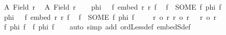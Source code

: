 \begin{isabellebody}
\ {\isacharquery}{\kern0pt}A{}\ {\isacharequal}{\kern0pt}{\isachardoublequoteopen}Field\ r{}{\isachardoublequoteclose}\ \isamarkupfalse%
\ {\isacharquery}{\kern0pt}A{}\ {\isacharequal}{\kern0pt}{\isachardoublequoteopen}Field\ r{}{\isachardoublequoteclose}\isanewline
\ \ \isamarkupfalse%
\ {\isacharquery}{\kern0pt}phi{}{}\ {\isacharequal}{\kern0pt}\ {\isachardoublequoteopen}{\isasymlambda}\ f{}{}{\isachardot}{\kern0pt}\ embed\ r{}\ r{}\ f{}{}{\isachardoublequoteclose}\ \isamarkupfalse%
\ {\isacharquery}{\kern0pt}f{}{}\ {\isacharequal}{\kern0pt}\ {\isachardoublequoteopen}SOME\ f{\isachardot}{\kern0pt}\ {\isacharquery}{\kern0pt}phi{}{}\ f{\isachardoublequoteclose}\isanewline
\ \ \isamarkupfalse%
\ {\isacharquery}{\kern0pt}phi{}{}\ {\isacharequal}{\kern0pt}\ {\isachardoublequoteopen}{\isasymlambda}\ f{}{}{\isachardot}{\kern0pt}\ embed\ r{}\ r{}\ f{}{}{\isachardoublequoteclose}\ \isamarkupfalse%
\ {\isacharquery}{\kern0pt}f{}{}\ {\isacharequal}{\kern0pt}\ {\isachardoublequoteopen}SOME\ f{\isachardot}{\kern0pt}\ {\isacharquery}{\kern0pt}phi{}{}\ f{\isachardoublequoteclose}\isanewline
\ \ \isamarkupfalse%
\ {\isacharasterisk}{\kern0pt}{\isacharcolon}{\kern0pt}\ {\isachardoublequoteopen}r{}\ {\isacharless}{\kern0pt}o\ r{}{\isachardoublequoteclose}\ {\isachardoublequoteopen}r{}\ {\isacharless}{\kern0pt}o\ r{}{\isachardoublequoteclose}\ \ {\isacharasterisk}{\kern0pt}{\isacharasterisk}{\kern0pt}{\isacharcolon}{\kern0pt}\ {\isachardoublequoteopen}r{}\ {\isacharless}{\kern0pt}o\ r{}{\isachardoublequoteclose}\isanewline
\ \ \isamarkupfalse%
\ {\isachardoublequoteopen}{\isacharparenleft}{\kern0pt}{\isasymexists}f{\isachardot}{\kern0pt}\ {\isacharquery}{\kern0pt}phi{}{}\ f{\isacharparenright}{\kern0pt}\ {\isasymand}\ {\isacharparenleft}{\kern0pt}{\isasymexists}f{\isachardot}{\kern0pt}\ {\isacharquery}{\kern0pt}phi{}{}\ f{\isacharparenright}{\kern0pt}{\isachardoublequoteclose}\isanewline
\ \ \isamarkupfalse%
\ {\isacharparenleft}{\kern0pt}auto\ simp\ add{\isacharcolon}{\kern0pt}\ ordLess{\isacharunderscore}{\kern0pt}def\ embedS{\isacharunderscore}{\kern0pt}def{\isacharparenright}{\kern0pt}\isanewline

\end{isabellebody}
